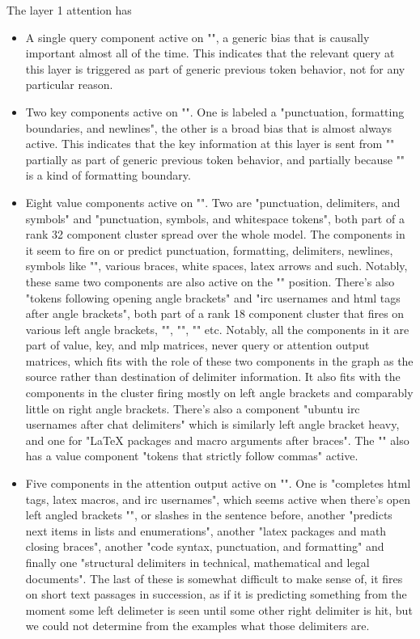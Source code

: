 \documentclass{article}
\begin{document}
The layer 1 attention has 
\begin{itemize}
\item {A single query component active on "", a generic bias that is causally important almost all of the time. This indicates that the relevant query at this layer is triggered as part of generic previous token behavior, not for any particular reason.}
\item{Two key components active on "\code{<}". One is labeled a "punctuation, formatting boundaries, and newlines", the other is a broad bias that is almost always active. This indicates that the key information at this layer is sent from "\code{<}" partially as part of generic previous token behavior, and partially because "\code{<}" is a kind of formatting boundary.}
\item{Eight value components active on "\code{<}". Two are "punctuation, delimiters, and symbols" and "punctuation, symbols, and whitespace tokens", both part of a rank 32 component cluster spread over the whole model. The components in it seem to fire on or predict punctuation, formatting, delimiters, newlines, symbols like "\code{=}", various braces, white spaces, latex arrows and such. Notably, these same two components are also active on the "\code{,}" position. There's also "tokens following opening angle brackets" and "irc usernames and html tags after angle brackets", both part of a rank 18 component cluster that fires on various left angle brackets, "\code{<}", "\code{></ }", "\code{\} <}" etc. Notably, all the components in it are part of value, key, and mlp matrices, never query or attention output matrices, which fits with the role of these two components in the graph as the source rather than destination of delimiter information. It also fits with the components in the cluster firing mostly on left angle brackets and comparably little on right angle brackets. There's also a component "ubuntu irc usernames after chat delimiters" which is similarly left angle bracket heavy, and one for "LaTeX packages and macro arguments after braces". The "\code{,}" also has a value component "tokens that strictly follow commas" active.}
\item{Five components in the attention output active on "". One is "completes html tags, latex macros, and irc usernames", which seems active when there's open left angled brackets "\code{<}", or slashes in the sentence before, another "predicts next items in lists and enumerations", another "latex packages and math closing braces", another "code syntax, punctuation, and formatting" and finally one "structural delimiters in technical, mathematical and legal documents". The last of these is somewhat difficult to make sense of, it fires on short text passages in succession, as if it is predicting something from the moment some left delimeter is seen until some other right delimiter is hit, but we could not determine from the examples what those delimiters are.}
\end{itemize}
\end{document}
